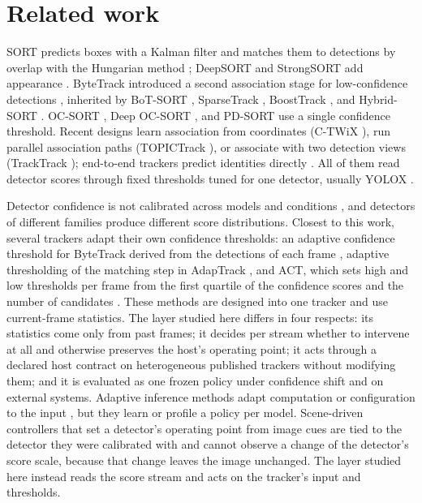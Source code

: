 \documentclass[pdflatex,sn-mathphys-num,iicol]{sn-jnl}
\begin{document}
\section{Related work}\label{sec:related}
SORT \cite{bewley2016sort} predicts boxes with a Kalman filter \cite{kalman1960} and matches them to detections by overlap with the Hungarian method \cite{kuhn1955hungarian}; DeepSORT and StrongSORT add appearance \cite{wojke2017deepsort,du2023strongsort}. ByteTrack introduced a second association stage for low-confidence detections \cite{zhang2022bytetrack}, inherited by BoT-SORT \cite{aharon2022botsort}, SparseTrack \cite{liu2025sparsetrack}, BoostTrack \cite{stanojevic2024boosttrack}, and Hybrid-SORT \cite{yang2024hybridsort}. OC-SORT \cite{cao2023ocsort}, Deep OC-SORT \cite{maggiolino2023deepocsort}, and PD-SORT \cite{wang2025pdsort} use a single confidence threshold. Recent designs learn association from coordinates (C-TWiX \cite{miah2025twix}), run parallel association paths (TOPICTrack \cite{cao2025topictrack}), or associate with two detection views (TrackTrack \cite{shim2025tracktrack}); end-to-end trackers predict identities directly \cite{zeng2022motr,gao2025motip}. All of them read detector scores through fixed thresholds tuned for one detector, usually YOLOX \cite{ge2021yolox}.

Detector confidence is not calibrated across models and conditions \cite{kuppers2020detcalib}, and detectors of different families \cite{redmon2016yolo,ren2017fasterrcnn,carion2020detr,zhao2024rtdetr} produce different score distributions. Closest to this work, several trackers adapt their own confidence thresholds: an adaptive confidence threshold for ByteTrack derived from the detections of each frame \cite{ma2023adaptivebytetrack}, adaptive thresholding of the matching step in AdapTrack \cite{shim2024adaptrack}, and ACT, which sets high and low thresholds per frame from the first quartile of the confidence scores and the number of candidates \cite{act2026adaptive}. These methods are designed into one tracker and use current-frame statistics. The layer studied here differs in four respects: its statistics come only from past frames; it decides per stream whether to intervene at all and otherwise preserves the host's operating point; it acts through a declared host contract on heterogeneous published trackers without modifying them; and it is evaluated as one frozen policy under confidence shift and on external systems. Adaptive inference methods adapt computation or configuration to the input \cite{han2022dynamic,jiang2018chameleon}, but they learn or profile a policy per model. Scene-driven controllers that set a detector's operating point from image cues are tied to the detector they were calibrated with and cannot observe a change of the detector's score scale, because that change leaves the image unchanged. The layer studied here instead reads the score stream and acts on the tracker's input and thresholds.
\end{document}
